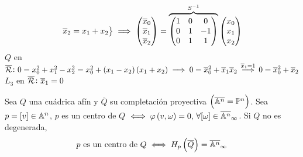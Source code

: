 \begin{example}
\begin{enumerate}
\begin{gather*}
\begin{rcases}
          \overline{x}_2 = x_1 + x_2
        \end{rcases}
        \implies
        \begin{pmatrix}
          \overline{x}_0 \\
          \overline{x}_1 \\
          \overline{x}_2
        \end{pmatrix} =
        \overbrace{ \begin{pmatrix}
          1 & 0 & 0 \\
          0 & 1 & -1 \\
          0 & 1 & 1
        \end{pmatrix}}^{S^{-1}}
        \begin{pmatrix}
          x_0 \\ x_1 \\ x_2
        \end{pmatrix}
      \end{gather*}
      $Q$ en $\overline{\mathcal{R}} \colon 0 = x_0^2 + x_1^2 - x_2^2 = x_0^2 + \left( x_1 - x_2 \right) \left( x_1 + x_2 \right) \implies 0 = \overline{x}_0^2 + \overline{x}_1\overline{x}_2 \stackrel{\overline{x}_1 = 1}{\implies} 0 = \overline{x}_0^2 + \overline{x}_2$ \\
      $L_3$ en $\overline{\mathcal{R}} \colon \overline{x}_1 = 0$
  \end{enumerate}
\end{example}
\begin{defi}
  Sea $Q$ una cuádrica afín y $\overline{Q}$ su completación proyectiva 
  $\left( \overline{\mathbb{A}^n} = \mathbb{P}^n \right)$. Sea $p=[v]\in\mathbb{A}^n$, $p$ es un 
  centro de $Q$ $\iff \varphi\left( v, \omega \right) = 0, \, 
  \forall [\omega] \in\overline{\mathbb{A}^n}_\infty$. Si $Q$ no es degenerada,
  \[ p \text{ es un centro de }Q \iff H_p\left( \overline{Q} \right) = 
  \overline{\mathbb{A}^n}_\infty \]
\end{defi}
